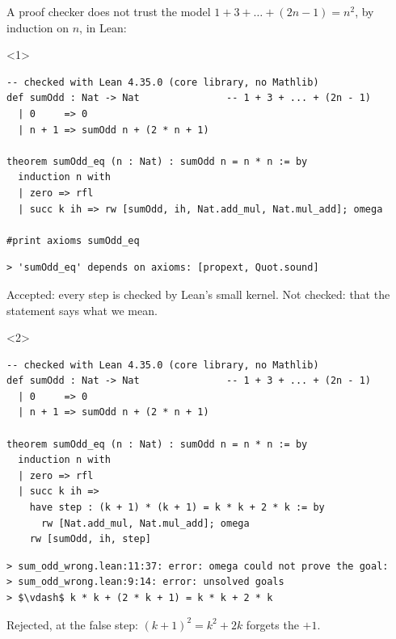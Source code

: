 \documentclass[10pt]{beamer}
\begin{document}
\begin{frame}[fragile,t]{A proof checker does not trust the model}
\footnotesize
{}
$1+3+\dots+(2n-1)=n^2$, by induction on $n$, in Lean\footnotemark:
\begin{onlyenv}<1>
\begin{lstlisting}[style=lean]
-- checked with Lean 4.35.0 (core library, no Mathlib)
def sumOdd : Nat -> Nat               -- 1 + 3 + ... + (2n - 1)
  | 0     => 0
  | n + 1 => sumOdd n + (2 * n + 1)

theorem sumOdd_eq (n : Nat) : sumOdd n = n * n := by
  induction n with
  | zero => rfl
  | succ k ih => rw [sumOdd, ih, Nat.add_mul, Nat.mul_add]; omega

#print axioms sumOdd_eq
\end{lstlisting}
\begin{lstlisting}[style=output, numbers=none]
> 'sumOdd_eq' depends on axioms: [propext, Quot.sound]
\end{lstlisting}
\alert{Accepted}: every step is checked by Lean's small kernel. Not checked: that the statement says what we mean.
\end{onlyenv}
\begin{onlyenv}<2>
\begin{lstlisting}[style=lean]
-- checked with Lean 4.35.0 (core library, no Mathlib)
def sumOdd : Nat -> Nat               -- 1 + 3 + ... + (2n - 1)
  | 0     => 0
  | n + 1 => sumOdd n + (2 * n + 1)

theorem sumOdd_eq (n : Nat) : sumOdd n = n * n := by
  induction n with
  | zero => rfl
  | succ k ih =>
    have step : (k + 1) * (k + 1) = k * k + 2 * k := by
      rw [Nat.add_mul, Nat.mul_add]; omega
    rw [sumOdd, ih, step]
\end{lstlisting}
\begin{lstlisting}[style=error, numbers=none, mathescape]
> sum_odd_wrong.lean:11:37: error: omega could not prove the goal:
> sum_odd_wrong.lean:9:14: error: unsolved goals
> $\vdash$ k * k + (2 * k + 1) = k * k + 2 * k
\end{lstlisting}
\alert{Rejected}, at the false step: $(k+1)^2=k^2+2k$ forgets the $+1$.
\end{onlyenv}
\end{frame}
\end{document}
